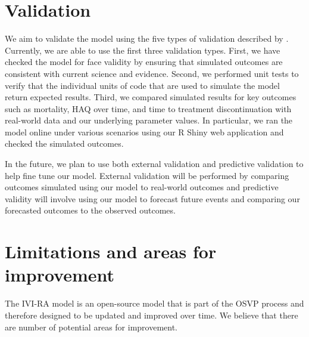 \documentclass[11pt,final,fleqn]{article}
\theoremstyle{plain}
\begin{document}
\section{Validation}\label{sec:validation}
We aim to validate the model using the five types of validation described by \citet{eddy2012model}. Currently, we are able to use the first three validation types. First, we have checked the model for face validity by ensuring that simulated outcomes are consistent with current science and evidence. Second, we performed unit tests to verify that the individual units of code that are used to simulate the model return expected results. Third, we compared simulated results for key outcomes such as mortality, HAQ over time, and time to treatment discontinuation with real-world data and our underlying parameter values. In particular, we ran the model online under various scenarios using our R Shiny web application and checked the simulated outcomes. 

In the future, we plan to use both external validation and predictive validation to help fine tune our model. External validation will be performed by comparing outcomes simulated using our model to real-world outcomes and predictive validity will involve using our model to forecast future events and comparing our forecasted outcomes to the observed outcomes. 

\section{Limitations and areas for improvement}\label{sec:limitations}
The IVI-RA model is an open-source model that is part of the OSVP process and therefore designed to be updated and improved over time. We believe that there are number of potential areas for improvement.
\end{document}
